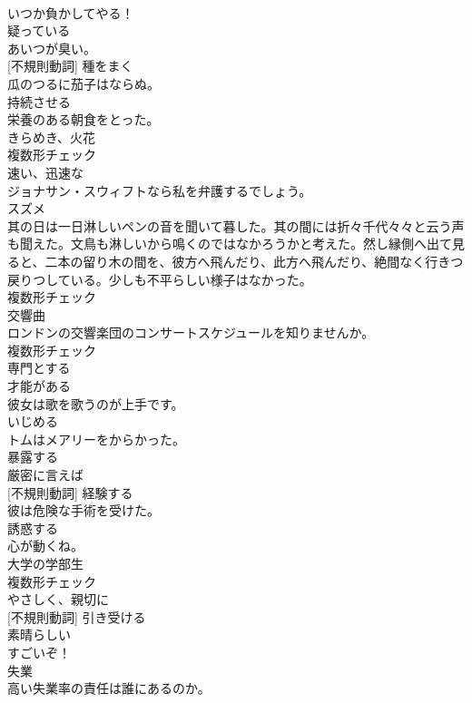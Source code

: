 \documentclass[8pt]{extreport}
\begin{document}
\begin{CJK}{UTF8}{min}
\\	いつか負かしてやる！	
\\	[形容詞]	疑っている	
\\	あいつが臭い。	
\\	[動詞] [不規則動詞]	種をまく	
\\	瓜のつるに茄子はならぬ。	
\\	[動詞]	持続させる	
\\	栄養のある朝食をとった。	
\\	[名詞]	きらめき、火花	
\\	複数形チェック
\\	[形容詞]	速い、迅速な	
\\	ジョナサン・スウィフトなら私を弁護するでしょう。	
\\	[名詞]	スズメ	
\\	其の日は一日淋しいペンの音を聞いて暮した。其の間には折々千代々々と云う声も聞えた。文鳥も淋しいから鳴くのではなかろうかと考えた。然し縁側へ出て見ると、二本の留り木の間を、彼方へ飛んだり、此方へ飛んだり、絶間なく行きつ戻りつしている。少しも不平らしい様子はなかった。	
\\	複数形チェック
\\	[名詞]	交響曲	
\\	ロンドンの交響楽団のコンサートスケジュールを知りませんか。	
\\	複数形チェック
\\	[動詞]	専門とする	
\\	[形容詞]	才能がある	
\\	彼女は歌を歌うのが上手です。	
\\	[動詞]	いじめる	
\\	トムはメアリーをからかった。	
\\	[動詞]	暴露する	
\\	[副詞]	厳密に言えば	
\\	[動詞] [不規則動詞]	経験する	
\\	彼は危険な手術を受けた。	
\\	[動詞]	誘惑する	
\\	心が動くね。	
\\	[名詞]	大学の学部生	
\\	複数形チェック
\\	[副詞]	やさしく、親切に	
\\	[動詞] [不規則動詞]	引き受ける	
\\	[形容詞]	素晴らしい	
\\	すごいぞ！	
\\	[名詞]	失業	
\\	高い失業率の責任は誰にあるのか。	

\end{CJK}
\end{document}
